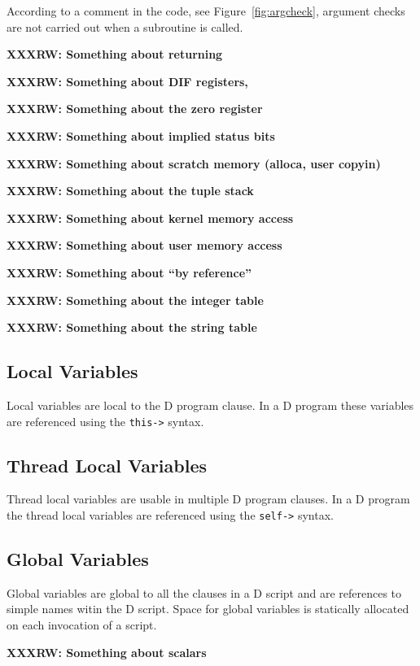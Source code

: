 According to a comment in the code, see Figure~\ref{fig:argcheck},
argument checks are not carried out when a subroutine is called.


\textbf{XXXRW: Something about returning}

\textbf{XXXRW: Something about DIF registers, \nregs{}}

\textbf{XXXRW: Something about the zero register}

\textbf{XXXRW: Something about implied status bits}

\textbf{XXXRW: Something about scratch memory (alloca, user copyin)}

\textbf{XXXRW: Something about the tuple stack}

\textbf{XXXRW: Something about kernel memory access}

\textbf{XXXRW: Something about user memory access}

\textbf{XXXRW: Something about ``by reference''}

\textbf{XXXRW: Something about the integer table}

\textbf{XXXRW: Something about the string table}

\subsection{Local Variables}
\label{sec:local-vars}

Local variables are local to the D program clause.  In a D program
these variables are referenced using the \verb|this->| syntax.  

\subsection{Thread Local Variables}
\label{sec:thread-local-vars}

Thread local variables are usable in multiple D program clauses.  In a
D program the thread local variables are referenced using the
\verb|self->| syntax.

\subsection{Global Variables}
\label{sec:globals-vars}

Global variables are global to all the clauses in a D script and are
references to simple names witin the D script.  Space for global
variables is statically allocated on each invocation of a script.

\textbf{XXXRW: Something about scalars}


